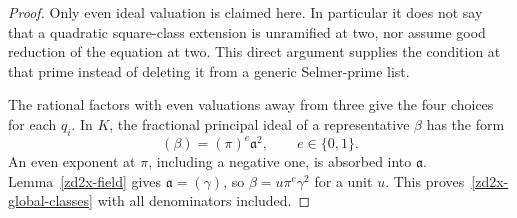 \begin{proof}
Only even ideal valuation is claimed here. In particular it
does not say that a quadratic square-class extension is
unramified at two, nor assume good reduction of the equation
at two. This direct argument supplies the condition at that
prime instead of deleting it from a generic Selmer-prime list.

The rational factors with even valuations away from three
give the four choices for each \(q_i\). In \(K\), the
fractional principal ideal of a representative \(\beta\)
has the form
\[
 (\beta)=(\pi)^e\mathfrak a^2,\qquad e\in\{0,1\}.
\]
An even exponent at \(\pi\), including a negative one, is
absorbed into \(\mathfrak a\). Lemma~\ref{zd2x-field} gives
\(\mathfrak a=(\gamma)\), so
\(\beta=u\pi^e\gamma^2\) for a unit \(u\).
This proves~\eqref{zd2x-global-classes} with all denominators
included.
\end{proof}

